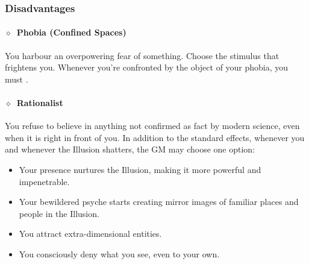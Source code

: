 \subsubsection{Disadvantages}%
\label{ssub:scientist_disadvantages}

\paragraph{\(\diamond\)~Phobia (Confined Spaces)}%
You harbour an overpowering fear of something. Choose the stimulus that frightens you. Whenever
you’re confronted by the object of your phobia, you must .
\KULTrule%

\paragraph{\(\diamond\)~Rationalist}%
You refuse to believe in anything not confirmed as fact by modern science, even when it is right in
front of you. In addition to the standard effects, whenever you 
and whenever the Illusion shatters, the GM may choose one option:
\begin{itemize}
  \item Your presence nurtures the Illusion, making it more powerful and impenetrable.
  \item Your bewildered psyche starts creating mirror images of familiar places and people in the Illusion.
  \item You attract extra-dimensional entities.
  \item You consciously deny what you see, even to your own.
\end{itemize}
\KULTrule%

\clearpage
